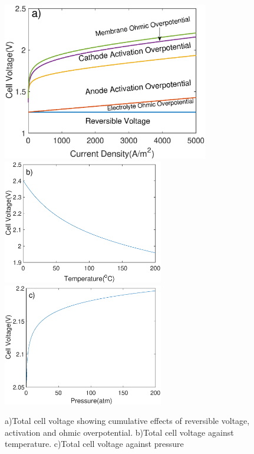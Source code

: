 \begin{figure}[h]
\centering
\includegraphics[width=9cm]{total.eps}
\newline
\includegraphics[width=7cm]{cellT.eps}
\includegraphics[width=7cm]{cellP.eps}
\caption{a)Total cell voltage showing cumulative effects of reversible voltage, activation and ohmic overpotential. b)Total cell voltage against temperature. c)Total cell voltage against pressure}
\label{fig:}
\end{figure}
